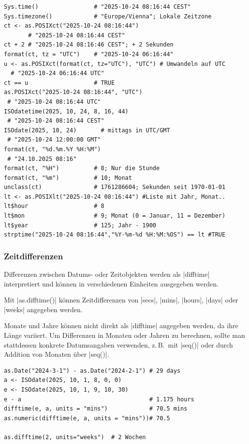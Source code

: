 \documentclass[10pt,twocolumn]{scrartcl}
\renewcommand{\lstinline}{\mycoloredinline}
\begin{document}
\begin{lstlisting}
Sys.time()                # "2025-10-24 08:16:44 CEST"
Sys.timezone()            # "Europe/Vienna"; Lokale Zeitzone
ct <- as.POSIXct("2025-10-24 08:16:44")
       # "2025-10-24 08:16:44 CEST"
ct + 2 # "2025-10-24 08:16:46 CEST"; + 2 Sekunden
format(ct, tz = "UTC")    # "2025-10-24 06:16:44"
u <- as.POSIXct(format(ct, tz="UTC"), "UTC") # Umwandeln auf UTC
  # "2025-10-24 06:16:44 UTC"
ct == u                   # TRUE
as.POSIXct("2025-10-24 08:16:44", "UTC")
 # "2025-10-24 08:16:44 UTC"
ISOdatetime(2025, 10, 24, 8, 16, 44)
 # "2025-10-24 08:16:44 CEST"
ISOdate(2025, 10, 24)       # mittags in UTC/GMT
 # "2025-10-24 12:00:00 GMT"
format(ct, "%d.%m.%Y %H:%M")
 # "24.10.2025 08:16"
format(ct, "%H")          # 8; Nur die Stunde
format(ct, "%m")          # 10; Monat
unclass(ct)               # 1761286604; Sekunden seit 1970-01-01
lt <- as.POSIXlt("2025-10-24 08:16:44") #Liste mit Jahr, Monat..
lt$hour                   # 8
lt$mon                    # 9; Monat (0 = Januar, 11 = Dezember)
lt$year                   # 125; Jahr - 1900
strptime("2025-10-24 08:16:44","%Y-%m-%d %H:%M:%OS") == lt #TRUE
\end{lstlisting}


\subsubsection{Zeitdifferenzen}

Differenzen zwischen Datums- oder Zeitobjekten werden als \lstinline|difftime|
interpretiert und können in verschiedenen Einheiten ausgegeben werden.

Mit \lstinline|as.difftime()| können Zeitdifferenzen von \lstinline|secs|, \lstinline|mins|, \lstinline|hours|, \lstinline|days| oder \lstinline|weeks| angegeben werden.

Monate und Jahre können nicht direkt als \lstinline|difftime| angegeben werden, da ihre Länge variiert. Um Differenzen in Monaten oder Jahren zu berechnen, sollte man stattdessen konkrete Datumsangaben verwenden, z.\,B.\ mit \lstinline|seq()| oder durch Addition von Monaten über \lstinline|seq()|.

\begin{lstlisting}
as.Date("2024-3-1") - as.Date("2024-2-1") # 29 days
a <- ISOdate(2025, 10, 1, 8, 0, 0)
e <- ISOdate(2025, 10, 1, 9, 10, 30)
e - a                                     # 1.175 hours
difftime(e, a, units = "mins")            # 70.5 mins
as.numeric(difftime(e, a, units = "mins"))# 70.5

as.difftime(2, units="weeks")  # 2 Wochen
\end{lstlisting}
\end{document}

